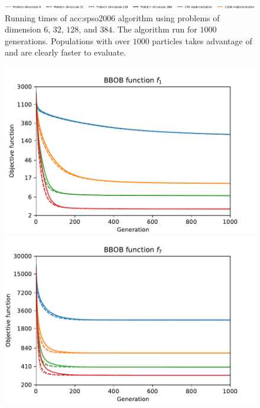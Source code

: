 \begin{figure}[ht!]
    \begin{minipage}{\textwidth}
        \centering
        \includegraphics[width=\textwidth]{img/runs/time_pso2006_alldim_legend.pdf}
    \end{minipage}

    \caption[PSO2006 running times]{Running times of \acrlong{acc:spso2006} algorithm using problems of dimension $6$, $32$, $128$, and $384$. The algorithm run for $1000$ generations. Populations with over $1000$ particles takes advantage of \gpu and are clearly faster to evaluate.}
\end{figure}

\begin{figure}[ht!]
    \centering
    \begin{minipage}[t]{0.32\textwidth}
        \centering
        \includegraphics[width=\textwidth]{img/runs/fitness_pso2006_f1.pdf}
    \end{minipage}
    \hfill
    \begin{minipage}[t]{0.32\textwidth}
        \centering
        \includegraphics[width=\textwidth]{img/runs/fitness_pso2006_f7.pdf}

\end{minipage}
\end{figure}
